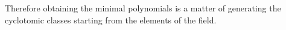 Therefore obtaining the minimal polynomials is a matter of generating the cyclotomic classes starting from the elements of the field.




